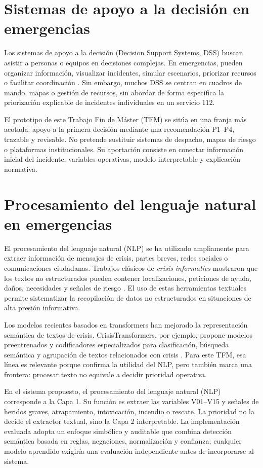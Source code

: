 \section{Sistemas de apoyo a la decisión en emergencias}

Los sistemas de apoyo a la decisión (Decision Support Systems, DSS) buscan asistir a personas o equipos en decisiones complejas. En emergencias, pueden organizar información, visualizar incidentes, simular escenarios, priorizar recursos o facilitar coordinación \cite{Turoff2004,Comes2011}. Sin embargo, muchos DSS se centran en cuadros de mando, mapas o gestión de recursos, sin abordar de forma específica la priorización explicable de incidentes individuales en un servicio 112.

El prototipo de este Trabajo Fin de Máster (TFM) se sitúa en una franja más acotada: apoyo a la primera decisión mediante una recomendación P1--P4, trazable y revisable. No pretende sustituir sistemas de despacho, mapas de riesgo o plataformas institucionales. Su aportación consiste en conectar información inicial del incidente, variables operativas, modelo interpretable y explicación normativa.

\section{Procesamiento del lenguaje natural en emergencias}

El procesamiento del lenguaje natural (NLP) se ha utilizado ampliamente para extraer información de mensajes de crisis, partes breves, redes sociales o comunicaciones ciudadanas. Trabajos clásicos de \textit{crisis informatics} mostraron que los textos no estructurados pueden contener localizaciones, peticiones de ayuda, daños, necesidades y señales de riesgo \cite{Vieweg2010,Caragea2011,Imran2015}. El uso de estas herramientas textuales permite sistematizar la recopilación de datos no estructurados en situaciones de alta presión informativa.

Los modelos recientes basados en transformers han mejorado la representación semántica de textos de crisis. CrisisTransformers, por ejemplo, propone modelos preentrenados y codificadores especializados para clasificación, búsqueda semántica y agrupación de textos relacionados con crisis \cite{Lamsal2024}. Para este TFM, esa línea es relevante porque confirma la utilidad del NLP, pero también marca una frontera: procesar texto no equivale a decidir prioridad operativa.

En el sistema propuesto, el procesamiento del lenguaje natural (NLP) corresponde a la Capa 1. Su función es extraer las variables V01--V15 y señales de heridos graves, atrapamiento, intoxicación, incendio o rescate. La prioridad no la decide el extractor textual, sino la Capa 2 interpretable. La implementación evaluada adopta un enfoque simbólico y auditable que combina detección semántica basada en reglas, negaciones, normalización y confianza; cualquier modelo aprendido exigiría una evaluación independiente antes de incorporarse al sistema.

